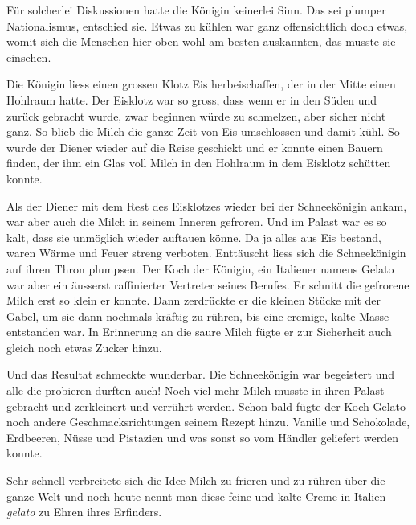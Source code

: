 Für solcherlei Diskussionen hatte die Königin keinerlei Sinn. Das sei plumper Nationalismus, entschied sie. Etwas zu kühlen war ganz offensichtlich doch etwas, womit sich die Menschen hier oben wohl am besten auskannten, das musste sie einsehen. 

Die Königin liess einen grossen Klotz Eis herbeischaffen, der in der Mitte einen Hohlraum hatte. Der Eisklotz war so gross, dass wenn er in den Süden und zurück gebracht wurde, zwar beginnen würde zu schmelzen, aber sicher nicht ganz. So blieb die Milch die ganze Zeit von Eis umschlossen und damit kühl. So wurde der Diener wieder auf die Reise geschickt und er konnte einen Bauern finden, der ihm ein Glas voll Milch in den Hohlraum in dem Eisklotz schütten konnte.

Als der Diener mit dem Rest des Eisklotzes wieder bei der Schneekönigin ankam, war aber auch die Milch in seinem Inneren gefroren. Und im Palast war es so kalt, dass sie unmöglich wieder auftauen könne. Da ja alles aus Eis bestand, waren Wärme und Feuer streng verboten. Enttäuscht liess sich die Schneekönigin auf ihren Thron plumpsen. Der Koch der Königin, ein Italiener namens Gelato war aber ein äusserst raffinierter Vertreter seines Berufes. Er schnitt die gefrorene Milch erst so klein er konnte. Dann zerdrückte er die kleinen Stücke mit der Gabel, um sie dann nochmals kräftig zu rühren, bis eine cremige, kalte Masse entstanden war. In Erinnerung an die saure Milch fügte er zur Sicherheit auch gleich noch etwas Zucker hinzu.

Und das Resultat schmeckte wunderbar. Die Schneekönigin war begeistert und alle die probieren durften auch! Noch viel mehr Milch musste in ihren Palast gebracht und zerkleinert und verrührt werden. Schon bald fügte der Koch Gelato noch andere Geschmacksrichtungen seinem Rezept hinzu. Vanille und Schokolade, Erdbeeren, Nüsse und Pistazien und was sonst so vom Händler geliefert werden konnte.

Sehr schnell verbreitete sich die Idee Milch zu frieren und zu rühren über die ganze Welt und noch heute nennt man diese feine und kalte Creme in Italien {\itshape gelato} zu Ehren ihres Erfinders.  \hfill {\color{red}\decofourleft}

